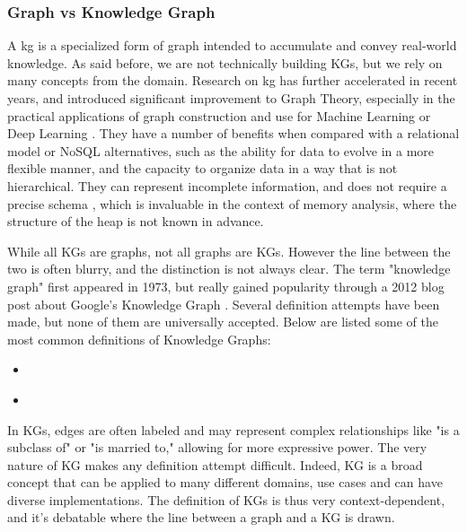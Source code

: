     \subsubsection{Graph vs Knowledge Graph}
    A \acrfull{kg} is a specialized form of graph intended to accumulate and convey real-world knowledge. As said before, we are not technically building KGs, but we rely on many concepts from the domain. Research on \acrshort{kg} has further accelerated in recent years, and introduced significant improvement to Graph Theory, especially in the practical applications of graph construction and use for Machine Learning or Deep Learning \cite{KG21}. They have a number of benefits when compared with a relational model or NoSQL alternatives, such as the ability for data to evolve in a more flexible manner, and the capacity to organize data in a way that is not hierarchical. They can represent incomplete information, and does not require a precise schema \cite[p.2]{KG21}, which is invaluable in the context of memory analysis, where the structure of the heap is not known in advance.

    While all KGs are graphs, not all graphs are KGs. However the line between the two is often blurry, and the distinction is not always clear. The term "knowledge graph" first appeared in 1973, but really gained popularity through a 2012 blog post about Google's Knowledge Graph \cite*{googleblog2023knowledgegraph}. Several definition attempts have been made, but none of them are universally accepted. Below are listed some of the most common definitions of Knowledge Graphs:
    \begin{itemize}
        \item {} \cite{KG21}
        \item {} \cite{CKG23}
    \end{itemize}
    
    In KGs, edges are often labeled and may represent complex relationships like "is a subclass of" or "is married to," allowing for more expressive power. The very nature of KG makes any definition attempt difficult. Indeed, KG is a broad concept that can be applied to many different domains, use cases and can have diverse implementations. The definition of KGs is thus very context-dependent, and it's debatable where the line between a graph and a KG is drawn. 
    
